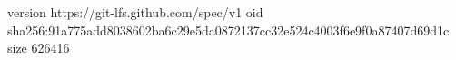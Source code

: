 version https://git-lfs.github.com/spec/v1
oid sha256:91a775add8038602ba6c29e5da0872137cc32e524c4003f6e9f0a87407d69d1c
size 626416
